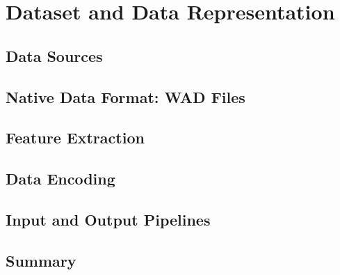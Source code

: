 \chapter{Dataset and Data Representation}
\section{Data Sources}
\section{Native Data Format: WAD Files}
\section{Feature Extraction}
\section{Data Encoding}
\section{Input and Output Pipelines}
\section{Summary}